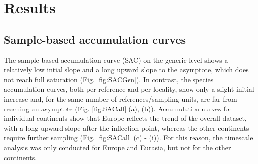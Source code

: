 \section{Results}


\subsection{Sample-based accumulation curves}
The sample-based accumulation curve (SAC) on the generic level shows a relatively low intial slope and a long upward slope to the asymptote, which does not reach full saturation (Fig. \ref{fig:SACGen}).
In contrast, the species accumulation curves, both per reference and per locality, show only a slight initial increase and, for the same number of references/sampling units, are far from reaching an asymptote (Fig. \ref{fig:SACall} (a), (b)).
Accumulation curves for individual continents show that Europe reflects the trend of the overall dataset, with a long upward slope after the inflection point, whereas the other continents require further sampling (Fig. \ref{fig:SACall} (c) - (i)). For this reason, the timescale analysis was only conducted for Europe and Eurasia, but not for the other continents.


